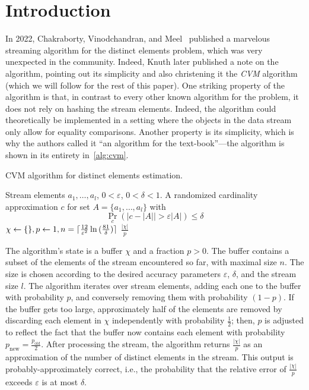 \section{Introduction}
\label{sec:intro}

In 2022, Chakraborty, Vinodchandran, and Meel~\cite{DBLP:conf/esa/0001VM22} published a marvelous streaming algorithm for the distinct elements problem, which was very unexpected in the community.
Indeed, Knuth later published a note on the algorithm, pointing out its simplicity and also christening it the \emph{CVM} algorithm (which we will follow for the rest of this paper).
One striking property of the algorithm is that, in contrast to every other known algorithm for the problem, it does not rely on hashing the stream elements.
Indeed, the algorithm could theoretically be implemented in a setting where the objects in the data stream only allow for equality comparisons.
Another property is its simplicity, which is why the authors called it ``an algorithm for the text-book''---the algorithm is shown in its entirety in~\cref{alg:cvm}.

\begin{algorithm}[h!]
	\caption{CVM algorithm for distinct elements estimation.}\label{alg:cvm}
	\begin{algorithmic}[1]
  \Require Stream elements $a_1,\dots,a_l$, $0 < \varepsilon$, $0 < \delta < 1$.
  \Ensure A randomized cardinality approximation $c$ for set $A = \{ a_1,\dots,a_l \}$ with $$\Pr_c \left( | c - |A| | > \varepsilon |A| \right) \leq \delta$$
  \State $\chi \gets \{\}, p \gets 1, n = \lceil\frac{12}{\varepsilon^2} \ln{(\frac{81}{\delta})} \rceil$
  \EndFor
  \Return $\frac{|\chi|}{p}$
  \end{algorithmic}
\end{algorithm}

The algorithm's state is a buffer $\chi$ and a fraction $p > 0$.
The buffer contains a subset of the elements of the stream encountered so far, with maximal size $n$.
The size is chosen according to the desired accuracy parameters $\varepsilon$, $\delta$, and the stream size $l$.
The algorithm iterates over stream elements, adding each one to the buffer with probability $p$, and conversely removing them with probability $(1-p)$.
If the buffer gets too large, approximately half of the elements are removed by discarding each element in $\chi$ independently with probability $\frac{1}{2}$; then, $p$ is adjusted to reflect the fact that the buffer now contains each element with probability $p_\text{new} = \frac{p_\text{old}}{2}$.
After processing the stream, the algorithm returns $\frac{|\chi|}{p}$ as an approximation of the number of distinct elements in the stream.
This output is probably-approximately correct, i.e., the probability that the relative error of $\frac{|\chi|}{p}$ exceeds $\varepsilon$ is at most $\delta$.

